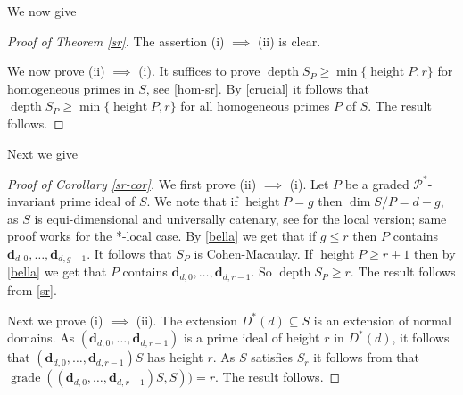 \documentclass{amsart}
\newcommand{\CM}{Cohen-Macaulay}
\newcommand{\db}{\mathbf{d} }
\newcommand{\Pc}{\mathcal{P} }
\newcommand{\grade}{\operatorname{grade}}
\newcommand{\depth}{\operatorname{depth}}
\newcommand{\height}{\operatorname{height}}
\theoremstyle{plain}
\theoremstyle{definition}
\theoremstyle{remark}
\begin{document}
We now give
\begin{proof}[Proof of Theorem \ref{sr}]
The assertion (i) $\implies$ (ii) is clear.

We now prove (ii) $\implies$ (i). It suffices to prove $\depth S_P \geq \min \{\height P, r \}$ for homogeneous primes in $S$, see \ref{hom-sr}.
By \ref{crucial} it follows that \\ $\depth S_P \geq \min \{ \height P, r \}$ for all homogeneous primes $P$ of $S$. The result follows.
\end{proof}

Next we give
\begin{proof}[Proof of Corollary \ref{sr-cor}]
We first prove (ii) $\implies $ (i). Let $P$ be a graded $\Pc^*$-invariant prime ideal of $S$. We note that if  $\height P = g$ then $\dim S/P = d - g$, as $S$ is equi-dimensional and universally catenary, see \cite[Lemma 2, p.\ 250]{Ma} for the local version; same proof works for the *-local case. By \ref{bella} we get that if $g \leq r$ then $P$ contains $\db_{d,0}, \ldots, \db_{d,g-1}$.
It follows that $S_P$ is \CM. If $\height P \geq r + 1$ then by \ref{bella}  we get that  $P$ contains $\db_{d,0}, \ldots, \db_{d,r-1}$.
So $\depth S_P \geq r$. The result follows from \ref{sr}.

Next we prove  (i) $\implies $ (ii). The extension $D^*(d) \subseteq S$ is an extension of normal domains. As $(\db_{d,0}, \ldots, \db_{d,r-1})$ is a prime ideal of height $r$ in $D^*(d)$, it follows that $(\db_{d,0}, \ldots, \db_{d,r-1})S$ has height $r$. As $S$ satisfies $S_r$ it follows from \cite[1.2.10]{BH} that $\grade \left( (\db_{d,0}, \ldots, \db_{d,r-1})S, S \right)) = r$. The result follows.
\end{proof}
\end{document}
